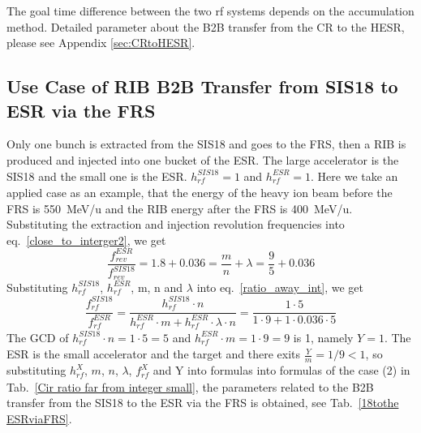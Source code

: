 The goal time difference between the two rf systems depends on the accumulation method. Detailed parameter about the B2B transfer from the CR to the HESR, please see Appendix \ref{sec:CRtoHESR}. 
\subsection{Use Case of RIB B2B Transfer from SIS18 to ESR via the FRS} 
Only one bunch is extracted from the SIS18 and goes to the FRS, then a RIB is produced and injected into one bucket of the ESR. The large accelerator is the SIS18 and the small one is the ESR. $h^{\mathit{SIS18}}_\mathit{rf}=1$ and $h^{\mathit{ESR}}_\mathit{rf}=1$. Here we take an applied case as an example, that the energy of the heavy ion beam before the FRS is \SI{550}{MeV/\atomicmassunit} and the RIB energy after the FRS is \SI{400}{MeV/\atomicmassunit}. Substituting the extraction and injection revolution frequencies into eq.~\ref{close_to_interger2}, we get
\begin{equation} 
\frac{f_{\mathit{rev}}^{\mathit{ESR}}}{f_{\mathit{rev}}^{\mathit{SIS18}}}=1.8+0.036=\frac{m}{n}+ \lambda=\frac{9}{5}+0.036
\end{equation}
Substituting $h^{\mathit{SIS18}}_\mathit{rf}$, $h^{\mathit{ESR}}_\mathit{rf}$, m, n and $\lambda$ into eq.~\ref{ratio_away_int}, we get
\begin{equation}
\frac{f_{\mathit{rf}}^{\mathit{SIS18}}}{f_{\mathit{rf}}^{\mathit{ESR}}}=\frac{h^{\mathit{SIS18}}_\mathit{rf}\cdot n}{h^{\mathit{ESR}}_\mathit{rf} \cdot m+ h^{\mathit{ESR}}_\mathit{rf} \cdot\lambda\cdot n}=\frac{1\cdot 5}{1 \cdot 9+1 \cdot0.036\cdot 5}
\end{equation}
The GCD of $h^{\mathit{SIS18}}_\mathit{rf}\cdot n=1\cdot5=5$ and $h^{\mathit{ESR}}_\mathit{rf} \cdot m=1\cdot 9=9$ is 1, namely $Y=1$. The ESR is the small accelerator and the target and there exits $\frac{Y}{m}=1/9<1$, so substituting $h^X_\mathit{rf}$, $m$, $n$, $\lambda$, $f_{\mathit{rf}}^{X}$ and Y into formulas into formulas of the case (2) in Tab.~\ref{Cir ratio far from integer small}, the parameters related to the B2B transfer from the SIS18 to the ESR via the FRS is obtained, see Tab.~\ref{18tothe ESRviaFRS}.
